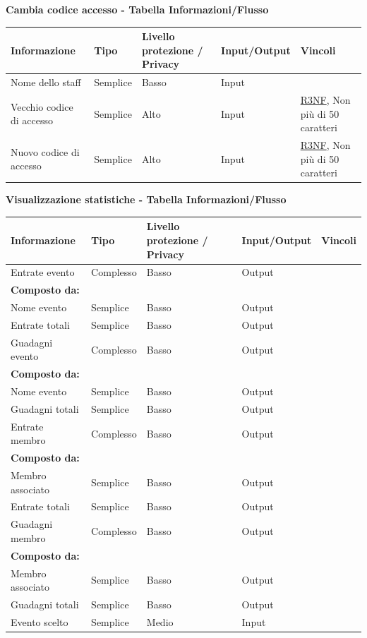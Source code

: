 \documentclass[a4paper]{article}
\begin{document}
\textbf{Cambia codice accesso  - Tabella Informazioni/Flusso}

\begin{center}
    \begin{tabularx}{1\textwidth}{|X|l|X|X|X|}
        \hline
        \textbf{Informazione} &\textbf{Tipo} & \textbf{Livello protezione / Privacy} & \textbf{Input/Output} & \textbf{Vincoli}\\
        \hline
        \hline
        Nome dello staff & Semplice & Basso & Input & \\
        \hline
        Vecchio codice di accesso & Semplice & Alto & Input & \hyperlink{R3NF}{R3NF}, Non più di 50 caratteri\\
        \hline
        Nuovo codice di accesso & Semplice & Alto & Input & \hyperlink{R3NF}{R3NF}, Non più di 50 caratteri\\
        \hline
    \end{tabularx}
\end{center}

\textbf{Visualizzazione statistiche  - Tabella Informazioni/Flusso}

\begin{center}
    \begin{tabularx}{1\textwidth}{|X|l|X|X|X|}
        \hline
        \textbf{Informazione} &\textbf{Tipo} & \textbf{Livello protezione / Privacy} & \textbf{Input/Output} & \textbf{Vincoli}\\
        \hline
        \hline
        Entrate evento & Complesso & Basso & Output & \\
        \textbf{Composto da:} & & & & \\
        Nome evento & Semplice & Basso & Output & \\
        Entrate totali & Semplice & Basso & Output & \\
        \hline
        Guadagni evento & Complesso & Basso & Output & \\
        \textbf{Composto da:} & & & & \\
        Nome evento & Semplice & Basso & Output & \\
        Guadagni totali & Semplice & Basso & Output & \\
        \hline
        Entrate membro & Complesso & Basso & Output & \\
        \textbf{Composto da:} & & & & \\
        Membro associato & Semplice & Basso & Output & \\
        Entrate totali & Semplice & Basso & Output & \\
        \hline
        Guadagni membro & Complesso & Basso & Output & \\
        \textbf{Composto da:} & & & & \\
        Membro associato & Semplice & Basso & Output & \\
        Guadagni totali & Semplice & Basso & Output & \\
        \hline
        Evento scelto & Semplice & Medio & Input & \\
        \hline
    \end{tabularx}
\end{center}
\end{document}
